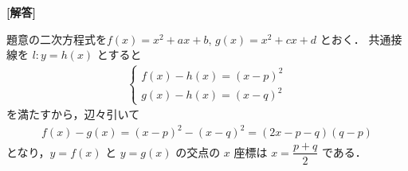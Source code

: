 \documentclass[../../main.tex]{subfiles}
\begin{document}
\begin{oframed}
  
\end{oframed}

{\bf [解答]}

題意の二次方程式を$f(x) = x^2+ax+b, \, g(x) = x^2+cx+d$ とおく．
共通接線を $l : y = h(x)$ とすると
\begin{align}
  \begin{cases}
    f(x) - h(x) = (x-p)^2 \\[5pt]
    g(x) - h(x) = (x-q)^2
  \end{cases}\label{eq:1}
\end{align}
を満たすから，辺々引いて
\begin{align}
  f(x) - g(x) = (x-p)^2 - (x-q)^2 = (2x - p - q)(q - p)
\end{align}
となり，$y = f(x)$ と $y = g(x)$ の交点の $x$ 座標は $x = \dfrac{p+q}{2}$ である．
\end{document}

